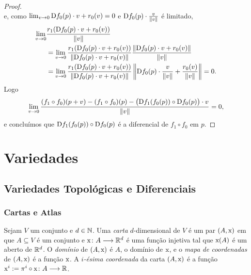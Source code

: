 \begin{proof}
\begin{equation*}
	\end{equation*}
e, como $\lim_{v \rightarrow 0} \mathrm{D} f_0(p) \cdot v + r_0(v) = 0$ e $\mathrm{D} f_0(p) \cdot \frac{v}{\left\Vert{v}\right\Vert}$ é limitado,
	\begin{align*}
	\lim_{v \rightarrow 0} &\frac{r_1(\mathrm{D} f_0(p) \cdot v + r_0(v))}{\left\Vert{v}\right\Vert} \\
		&= \lim_{v \rightarrow 0} \frac{r_1(\mathrm{D} f_0(p) \cdot v + r_0(v))}{\left\Vert{\mathrm{D}f_0(p) \cdot v + r_0(v)}\right\Vert} \frac{\left\Vert{\mathrm{D}f_0(p) \cdot v + r_0(v)}\right\Vert}{\left\Vert{v}\right\Vert}\\
		&= \lim_{v \rightarrow 0} \frac{r_1(\mathrm{D} f_0(p) \cdot v + r_0(v))}{\left\Vert{\mathrm{D}f_0(p) \cdot v + r_0(v)}\right\Vert} \left\Vert{\mathrm{D}f_0(p) \cdot \frac{v}{\left\Vert{v}\right\Vert}+ \frac{r_0(v)}{\left\Vert{v}\right\Vert}}\right\Vert = 0.
	\end{align*}
Logo
	\begin{equation*}
	\lim_{v \rightarrow 0} \frac{(f_1 \circ f_0)(p+v) - (f_1 \circ f_0)(p) - \big(\mathrm{D} f_1(f_0(p)) \circ \mathrm{D} f_0(p)\big) \cdot v}{\left\Vert{v}\right\Vert} = 0,
	\end{equation*}
e concluímos que $\mathrm{D} f_1(f_0(p)) \circ \mathrm{D} f_0(p)$ é a diferencial de $f_1 \circ f_0$ em $p$.
\end{proof}















\chapter{Variedades}

\section{Variedades Topológicas e Diferenciais}

\subsection{Cartas e Atlas}

\begin{defi}
Sejam $V$ um conjunto e $d \in \mathbb{N}$. Uma \emph{carta} $d$-dimensional de $V$ é um par $(A,\mathrm{x})$ em que $A \subseteq V$ é um conjunto e $\mathrm{x}\colon A \longrightarrow \mathbb{R}^d$ é uma função injetiva tal que $\mathrm{x}(A)$ é um aberto de $\mathbb{R}^d$. O \emph{domínio} de $(A,\mathrm{x})$ é $A$, o domínio de $\mathrm{x}$, e o \emph{mapa de coordenadas} de $(A,\mathrm{x})$ é a função $\mathrm{x}$. A \emph{$i$-ésima coordenada} da carta $(A,\mathrm{x})$ é a função $\mathrm{x}^i := \pi^i \circ \mathrm{x}\colon A \longrightarrow \mathbb{R}$.
\end{defi}

